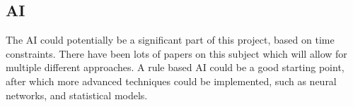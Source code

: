 \subsection{AI}
The AI could potentially be a significant part of this project, based on time constraints.
There have been lots of papers on this subject which will allow for multiple different approaches.
A rule based AI\cite{watson2008} could be a good starting point, after which more advanced techniques could be implemented, such as neural networks\cite{teofilo2011}, and statistical models\cite{billings2002}.
